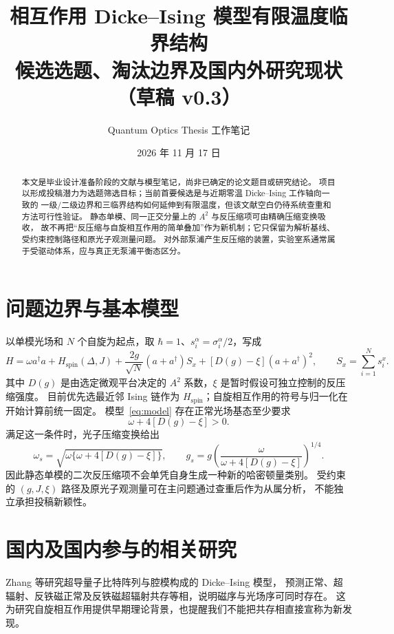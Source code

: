 \documentclass[UTF8,11pt,a4paper]{ctexart}
\title{相互作用 Dicke--Ising 模型有限温度临界结构\\[0.4em]
\large 候选选题、淘汰边界及国内外研究现状（草稿 v0.3）}
\author{Quantum Optics Thesis 工作笔记}
\date{2026 年 11 月 17 日}
\begin{document}
\maketitle

\begin{abstract}
本文是毕业设计准备阶段的文献与模型笔记，尚非已确定的论文题目或研究结论。
项目以形成投稿潜力为选题筛选目标；当前首要候选是与近期零温 Dicke--Ising 工作轴向一致的
一级/二级边界和三临界结构如何延伸到有限温度，但该文献空白仍待系统查重和方法可行性验证。
静态单模、同一正交分量上的 $A^2$ 与反压缩项可由精确压缩变换吸收，
故不再把“反压缩与自旋相互作用的简单叠加”作为新机制；它只保留为解析基线、受约束控制路径和原光子观测量问题。
对外部泵浦产生反压缩的装置，实验室系通常属于受驱动体系，应与真正无泵浦平衡态区分。
\end{abstract}

\section{问题边界与基本模型}

以单模光场和 $N$ 个自旋为起点，取 $\hbar=1$、$s_i^\alpha=\sigma_i^\alpha/2$，写成
\begin{equation}
 H=\omega a^\dagger a+H_{\mathrm{spin}}(\Delta,J)
 +\frac{2g}{\sqrt N}(a+a^\dagger)S_x
 +[D(g)-\xi](a+a^\dagger)^2,
 \qquad S_x=\sum_{i=1}^{N}s_i^x .
 \label{eq:model}
\end{equation}
其中 $D(g)$ 是由选定微观平台决定的 $A^2$ 系数，$\xi$ 是暂时假设可独立控制的反压缩强度。
目前优先选最近邻 Ising 链作为 $H_{\mathrm{spin}}$；自旋相互作用的符号与归一化在开始计算前统一固定。
模型~\eqref{eq:model} 存在正常光场基态至少要求
\begin{equation}
  \omega+4[D(g)-\xi]>0 . \label{eq:stability}
\end{equation}
满足这一条件时，光子压缩变换给出
\begin{equation}
 \omega_s=\sqrt{\omega\{\omega+4[D(g)-\xi]\}},\qquad
 g_s=g\left(\frac{\omega}{\omega+4[D(g)-\xi]}\right)^{1/4}.
 \label{eq:squeezed}
\end{equation}
因此静态单模的二次反压缩项不会单凭自身生成一种新的哈密顿量类别。
受约束的 $(g,J,\xi)$ 路径及原光子观测量可在主问题通过查重后作为从属分析，
不能独立承担投稿新颖性。

\section{国内及国内参与的相关研究}

Zhang 等研究超导量子比特阵列与腔模构成的 Dicke--Ising 模型，
预测正常、超辐射、反铁磁正常及反铁磁超辐射共存等相，说明磁序与光场序可同时存在\cite{Zhang2014CircuitIsing}。
这为研究自旋相互作用提供早期理论背景，也提醒我们不能把共存相直接宣称为新发现。
\end{document}
